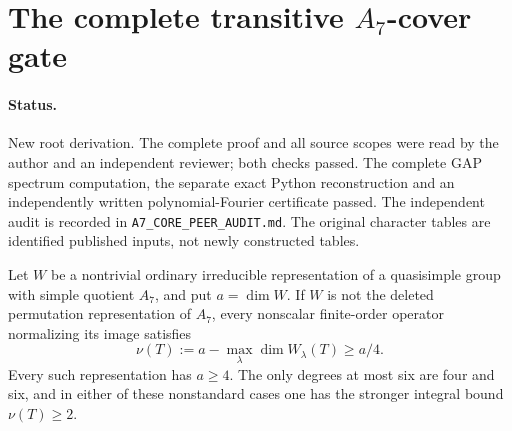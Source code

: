 \section{The complete transitive $A_7$-cover gate}
\label{sec:a7-cores}

\paragraph{Status.}
New root derivation. The complete proof and all source scopes were
read by the author and an independent reviewer; both checks passed.
The complete GAP spectrum computation, the separate exact Python
reconstruction and an independently written polynomial-Fourier
certificate passed. The independent audit is recorded in
\texttt{A7\_CORE\_PEER\_AUDIT.md}.
The original character tables are identified published inputs, not
newly constructed tables.

\begin{lemma}
\label{D-A7-01}
Let $W$ be a nontrivial ordinary irreducible representation of a
quasisimple group with simple quotient $A_7$, and put $a=\dim W$.
If $W$ is not the deleted permutation representation of $A_7$,
every nonscalar finite-order operator normalizing its image satisfies
\[
                  \nu(T):=a-\max_\lambda\dim W_\lambda(T)
                            \ge a/4.                 \tag{A7.1}
\]
Every such representation has $a\ge4$. The only degrees at most six
are four and six, and in either of these nonstandard cases one has
the stronger integral bound $\nu(T)\ge2$.
\end{lemma}

